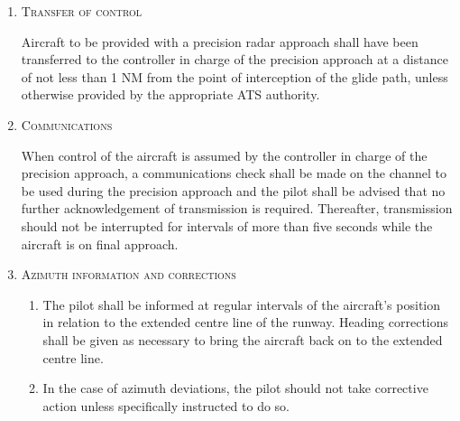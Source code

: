 \begin{enumeratesc}
\begin{enumerate}[labelindent=0pt,itemsep=0.2cm]
        \item \textsc{Transfer of control}
        \par\noindent Aircraft to be provided with a precision radar approach shall have been transferred to the controller in charge of the precision approach at a distance of not less than 1 NM from the point of interception of the glide path, unless otherwise provided by the appropriate ATS authority.

        \item \textsc{Communications}
        \par\noindent When control of the aircraft is assumed by the controller in charge of the precision approach, a communications check shall be made on the channel to be used during the precision approach and the pilot shall be advised that no further acknowledgement of transmission is required. Thereafter, transmission should not be interrupted for intervals of more than five seconds while the aircraft is on final approach.

        \item \label{8.9.7.2.4} \textsc{Azimuth information and corrections}
        \begin{enumerate}
            \item The pilot shall be informed at regular intervals of the aircraft's position in relation to the extended centre line of the runway. Heading corrections shall be given as necessary to bring the aircraft back on to the extended centre line.
            \item In the case of azimuth deviations, the pilot should not take corrective action unless specifically instructed to do so.
        \end{enumerate}


\end{enumerate}
\end{enumeratesc}
